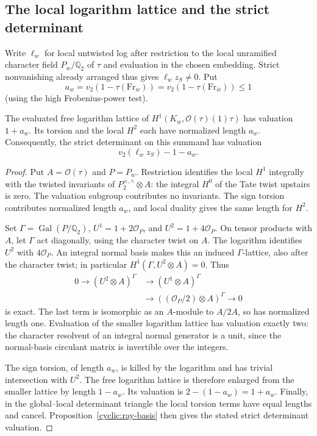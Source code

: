 \subsection{The local logarithm lattice and the strict determinant}

Write \(\ell_w\) for local untwisted log after restriction to the local
unramified character field \(P_w/\mathbb Q_2\) of \(\tau\) and evaluation in
the chosen embedding. Strict nonvanishing already arranged thus gives \(\ell_w
z_S\ne0\). Put
\[
 a_w=v_2(1-\tau(\mathrm{Fr}_w))=v_2(1-\tau(\mathrm{Fr}_{\bar w}))\le1
\]
(using the high Frobenius-power test).

\begin{lemma}\label{cyclic:local-log}
The evaluated free logarithm lattice of
\(H^1(K_w,\mathcal O(\tau)(1)\tau)\) has valuation \(1+a_w\).
Its torsion and the local \(H^2\) each have normalized length \(a_w\).
Consequently, the strict determinant on this summand has valuation
\[
 v_2(\ell_wz_S)-1-a_w.
\]
\end{lemma}

\begin{proof}
Put \(A=\mathcal O(\tau)\) and \(P=P_w\).  Restriction identifies the
local \(H^1\) integrally with the twisted invariants of
\(P^{\times,\wedge}_2\otimes A\): the integral \(H^0\) of the Tate
twist upstairs is zero.  The valuation subgroup contributes no
invariants.  The sign torsion contributes normalized length \(a_w\),
and local duality gives the same length for \(H^2\).

Set \(\Gamma=\operatorname{Gal}(P/\mathbb Q_2)\),
\(U^1=1+2\mathcal O_P\), and \(U^2=1+4\mathcal O_P\).
On tensor products with \(A\), let \(\Gamma\) act diagonally,
using the character twist on \(A\). The logarithm identifies
\(U^2\) with \(4\mathcal O_P\). An integral normal basis makes
this an induced \(\Gamma\)-lattice, also after the character twist;
in particular \(H^1(\Gamma,U^2\otimes A)=0\). Thus
\[
\begin{split}
0\longrightarrow (U^2\otimes A)^\Gamma
 &\longrightarrow (U^1\otimes A)^\Gamma\\
 &\longrightarrow ((\mathcal O_P/2)\otimes A)^\Gamma
 \longrightarrow0
\end{split}
\]
is exact. The last term is isomorphic as an \(A\)-module to
\(A/2A\), so has normalized length one. Evaluation of the smaller
logarithm lattice has valuation exactly two: the character resolvent
of an integral normal generator is a unit, since the normal-basis
circulant matrix is invertible over the integers.

The sign torsion, of length \(a_w\), is killed by the logarithm and
has trivial intersection with \(U^2\).  The free logarithm lattice is
therefore enlarged from the smaller lattice by length \(1-a_w\).
Its valuation is \(2-(1-a_w)=1+a_w\).  Finally, in the global--local
determinant triangle the local torsion terms have equal lengths and
cancel.  Proposition~\ref{cyclic:ray-basis} then gives the stated
strict determinant valuation.
\end{proof}

